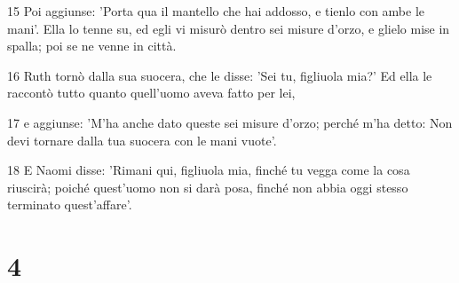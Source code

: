 \par 15 Poi aggiunse: 'Porta qua il mantello che hai addosso, e tienlo con ambe le mani'. Ella lo tenne su, ed egli vi misurò dentro sei misure d'orzo, e glielo mise in spalla; poi se ne venne in città.
\par 16 Ruth tornò dalla sua suocera, che le disse: 'Sei tu, figliuola mia?' Ed ella le raccontò tutto quanto quell'uomo aveva fatto per lei,
\par 17 e aggiunse: 'M'ha anche dato queste sei misure d'orzo; perché m'ha detto: Non devi tornare dalla tua suocera con le mani vuote'.
\par 18 E Naomi disse: 'Rimani qui, figliuola mia, finché tu vegga come la cosa riuscirà; poiché quest'uomo non si darà posa, finché non abbia oggi stesso terminato quest'affare'.

\chapter{4}


